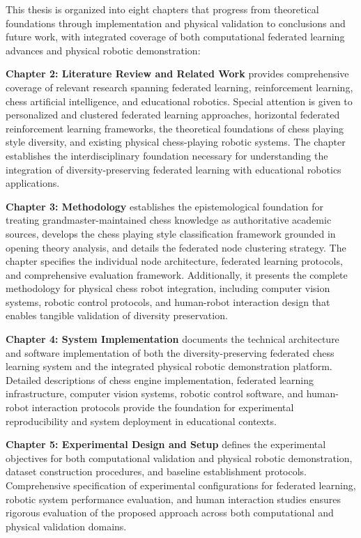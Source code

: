 This thesis is organized into eight chapters that progress from theoretical foundations through implementation and physical validation to conclusions and future work, with integrated coverage of both computational federated learning advances and physical robotic demonstration:

\textbf{Chapter 2: Literature Review and Related Work} provides comprehensive coverage of relevant research spanning federated learning, reinforcement learning, chess artificial intelligence, and educational robotics. Special attention is given to personalized and clustered federated learning approaches, horizontal federated reinforcement learning frameworks, the theoretical foundations of chess playing style diversity, and existing physical chess-playing robotic systems. The chapter establishes the interdisciplinary foundation necessary for understanding the integration of diversity-preserving federated learning with educational robotics applications.

\textbf{Chapter 3: Methodology} establishes the epistemological foundation for treating grandmaster-maintained chess knowledge as authoritative academic sources, develops the chess playing style classification framework grounded in opening theory analysis, and details the federated node clustering strategy. The chapter specifies the individual node architecture, federated learning protocols, and comprehensive evaluation framework. Additionally, it presents the complete methodology for physical chess robot integration, including computer vision systems, robotic control protocols, and human-robot interaction design that enables tangible validation of diversity preservation.

\textbf{Chapter 4: System Implementation} documents the technical architecture and software implementation of both the diversity-preserving federated chess learning system and the integrated physical robotic demonstration platform. Detailed descriptions of chess engine implementation, federated learning infrastructure, computer vision systems, robotic control software, and human-robot interaction protocols provide the foundation for experimental reproducibility and system deployment in educational contexts.

\textbf{Chapter 5: Experimental Design and Setup} defines the experimental objectives for both computational validation and physical robotic demonstration, dataset construction procedures, and baseline establishment protocols. Comprehensive specification of experimental configurations for federated learning, robotic system performance evaluation, and human interaction studies ensures rigorous evaluation of the proposed approach across both computational and physical validation domains.

